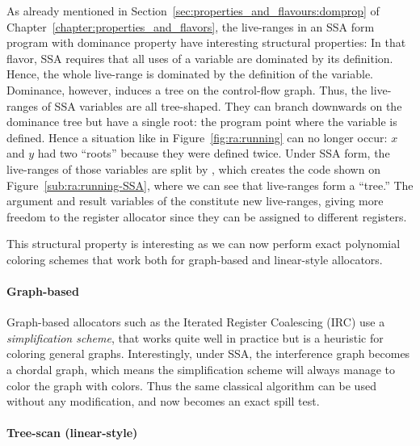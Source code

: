 {

As already mentioned in Section~\ref{sec:properties_and_flavours:domprop} of Chapter~\ref{chapter:properties_and_flavors}, the live-ranges in an SSA form program with dominance property have interesting structural properties:
In that flavor, SSA requires that all uses of a variable are dominated by its definition.
Hence, the whole live-range is dominated by the definition of the variable.
Dominance, however, induces a tree on the control-flow graph.
Thus, the live-ranges of SSA variables are all tree-shaped.
They can branch downwards on the dominance tree but have a single root:
the program point where the variable is defined.
Hence a situation like in Figure~\ref{fig:ra:running} can no longer occur:
$x$ and $y$ had two ``roots'' because they were defined twice.
Under SSA form, the live-ranges of those variables are split by \phifuns, which creates the code shown on Figure~\ref{sub:ra:running-SSA}, where we can see that live-ranges form a ``tree.''
The argument and result variables of the \phifuns constitute new live-ranges, giving more freedom to the register allocator since they can be assigned to different registers.

This structural property is interesting as we can now perform exact polynomial coloring schemes that work both for graph-based and linear-style allocators.


\paragraph{Graph-based} 
Graph-based allocators such as the Iterated Register Coalescing (IRC) use a \emph{simplification scheme}, that works quite well in practice but is a heuristic for coloring general graphs.
Interestingly, under SSA, the interference graph becomes a chordal graph, which means the simplification scheme will always manage to color the graph with \maxlive colors.
Thus the same classical algorithm can be used without any modification, and now becomes an exact spill test.


\paragraph{Tree-scan (linear-style)}

}
